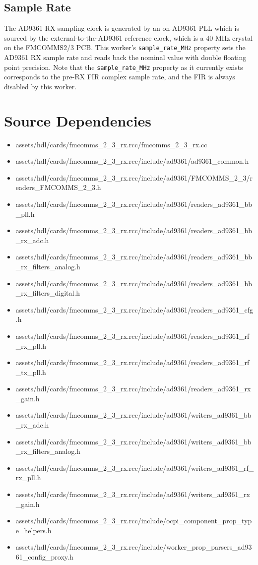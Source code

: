 \subsection*{Sample Rate}
The AD9361 RX sampling clock is generated by an on-AD9361 PLL which is sourced by the external-to-the-AD9361 reference clock, which is a 40 MHz crystal on the FMCOMMS2/3 PCB. This worker's \verb+sample_rate_MHz+ property sets the AD9361 RX sample rate and reads back the nominal value with double floating point precision. Note that the \verb+sample_rate_MHz+ property as it currently exists corresponds to the pre-RX FIR complex sample rate, and the FIR is always disabled by this worker.

\newpage

\section*{Source Dependencies}
\begin{itemize}
	\item assets/hdl/cards/fmcomms\_2\_3\_rx.rcc/fmcomms\_2\_3\_rx.cc
	\item assets/hdl/cards/fmcomms\_2\_3\_rx.rcc/include/ad9361/ad9361\_common.h
	\item assets/hdl/cards/fmcomms\_2\_3\_rx.rcc/include/ad9361/FMCOMMS\_2\_3/readers\_FMCOMMS\_2\_3.h
	\item assets/hdl/cards/fmcomms\_2\_3\_rx.rcc/include/ad9361/readers\_ad9361\_bb\_pll.h
	\item assets/hdl/cards/fmcomms\_2\_3\_rx.rcc/include/ad9361/readers\_ad9361\_bb\_rx\_adc.h
	\item assets/hdl/cards/fmcomms\_2\_3\_rx.rcc/include/ad9361/readers\_ad9361\_bb\_rx\_filters\_analog.h
	\item assets/hdl/cards/fmcomms\_2\_3\_rx.rcc/include/ad9361/readers\_ad9361\_bb\_rx\_filters\_digital.h
	\item assets/hdl/cards/fmcomms\_2\_3\_rx.rcc/include/ad9361/readers\_ad9361\_cfg.h
	\item assets/hdl/cards/fmcomms\_2\_3\_rx.rcc/include/ad9361/readers\_ad9361\_rf\_rx\_pll.h
	\item assets/hdl/cards/fmcomms\_2\_3\_rx.rcc/include/ad9361/readers\_ad9361\_rf\_tx\_pll.h
	\item assets/hdl/cards/fmcomms\_2\_3\_rx.rcc/include/ad9361/readers\_ad9361\_rx\_gain.h
	\item assets/hdl/cards/fmcomms\_2\_3\_rx.rcc/include/ad9361/writers\_ad9361\_bb\_rx\_adc.h
	\item assets/hdl/cards/fmcomms\_2\_3\_rx.rcc/include/ad9361/writers\_ad9361\_bb\_rx\_filters\_analog.h
	\item assets/hdl/cards/fmcomms\_2\_3\_rx.rcc/include/ad9361/writers\_ad9361\_rf\_rx\_pll.h
	\item assets/hdl/cards/fmcomms\_2\_3\_rx.rcc/include/ad9361/writers\_ad9361\_rx\_gain.h
	\item assets/hdl/cards/fmcomms\_2\_3\_rx.rcc/include/ocpi\_component\_prop\_type\_helpers.h
	\item assets/hdl/cards/fmcomms\_2\_3\_rx.rcc/include/worker\_prop\_parsers\_ad9361\_config\_proxy.h
\end{itemize}

